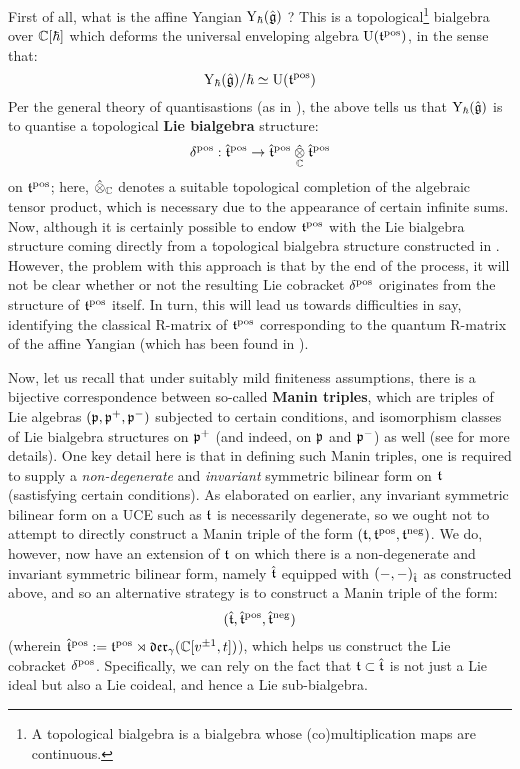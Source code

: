        First of all, what is the affine Yangian $\mathrm{Y}_{\hbar}(\hat{\mathfrak{g}})$ ? This is a topological\footnote{A topological bialgebra is a bialgebra whose (co)multiplication maps are continuous.} bialgebra over $\mathbb{C}[\hbar]$ which deforms the universal enveloping algebra $\mathrm{U}(\mathfrak{t}^{\mathrm{pos}})$, in the sense that:
            $$\mathrm{Y}_{\hbar}(\hat{\mathfrak{g}})/\hbar \simeq \mathrm{U}(\mathfrak{t}^{\mathrm{pos}})$$
        Per the general theory of quantisastions (as in \cite{etingof_kazhdan_quantisation_1}), the above tells us that $\mathrm{Y}_{\hbar}(\hat{\mathfrak{g}})$ is to quantise a topological \textbf{Lie bialgebra} structure:
            $$\delta^{\positive}: \extendedtoroidal^{\positive} \to \extendedtoroidal^{\positive} \hattensor_{\bbC} \extendedtoroidal^{\positive}$$
        on $\mathfrak{t}^{\mathrm{pos}}$; here, $\hattensor_{\bbC}$ denotes a suitable topological completion of the algebraic tensor product, which is necessary due to the appearance of certain infinite sums. Now, although it is certainly possible to endow $\mathfrak{t}^{\mathrm{pos}}$ with the Lie bialgebra structure coming directly from a topological bialgebra structure constructed in \cite{guay_nakajima_wendlandt_affine_yangian_coproduct}. However, the problem with this approach is that by the end of the process, it will not be clear whether or not the resulting Lie cobracket $\delta^{\mathrm{pos}}$ originates from the structure of $\mathfrak{t}^{\mathrm{pos}}$ itself. In turn, this will lead us towards difficulties in say, identifying the classical R-matrix of $\mathfrak{t}^{\mathrm{pos}}$ corresponding to the quantum R-matrix of the affine Yangian (which has been found in \cite{appel_gautam_wendlandt_R_matrices_of_affine_yangians}).
        
        Now, let us recall that under suitably mild finiteness assumptions, there is a bijective correspondence between so-called \textbf{Manin triples}, which are triples of Lie algebras $(\mathfrak{p}, \mathfrak{p}^+, \mathfrak{p}^-)$ subjected to certain conditions, and isomorphism classes of Lie bialgebra structures on $\mathfrak{p}^+$ (and indeed, on $\mathfrak{p}$ and $\mathfrak{p}^-$) as well (see \cite{etingof_kazhdan_quantisation_1} for more details). One key detail here is that in defining such Manin triples, one is required to supply a \textit{non-degenerate} and \textit{invariant} symmetric bilinear form on $\mathfrak{t}$ (sastisfying certain conditions). As elaborated on earlier, any invariant symmetric bilinear form on a UCE such as $\mathfrak{t}$ is necessarily degenerate, so we ought not to attempt to directly construct a Manin triple of the form $(\mathfrak{t}, \mathfrak{t}^{\mathrm{pos}}, \mathfrak{t}^{\mathrm{neg}})$. We do, however, now have an extension of $\mathfrak{t}$ on which there is a non-degenerate and invariant symmetric bilinear form, namely $\hat{\mathfrak{t}}$ equipped with $(-, -)_{\hat{\mathfrak{t}}}$ as constructed above, and so an alternative strategy is to construct a Manin triple of the form:
            $$(\hat{\mathfrak{t}}, \hat{\mathfrak{t}}^{\mathrm{pos}}, \hat{\mathfrak{t}}^{\mathrm{neg}})$$
        (wherein $\hat{\mathfrak{t}}^{\mathrm{pos}} := \mathfrak{t}^{\mathrm{pos}} \rtimes \mathfrak{der}_{\gamma}(\mathbb{C}[v^{\pm 1}, t])$), which helps us construct the Lie cobracket $\delta^{\mathrm{pos}}$. Specifically, we can rely on the fact that $\mathfrak{t} \subset \hat{\mathfrak{t}}$ is not just a Lie ideal but also a Lie coideal, and hence a Lie sub-bialgebra. 

